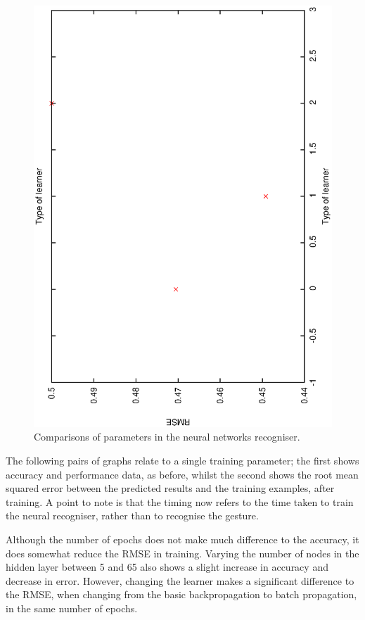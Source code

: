 \documentclass[12pt,a4,notitlepage]{report}
\renewcommand{\_}{\texttt{\symbol{95}}}
\newcommand{\<}{\texttt{\symbol{60}}}
\renewcommand{\>}{\texttt{\symbol{62}}}
\begin{document}
\begin{figure}
\includegraphics[scale=0.3,angle=-90]{results/neural_err/n_learner.ps}
\caption{Comparisons of parameters in the neural networks recogniser.}
\label{n_intparameters}
\end{figure}

The following pairs of graphs relate to a single training parameter; the first shows accuracy and performance data, as before, whilst the second shows the root mean squared error between the predicted results and the training examples, after training. A point to note is that the timing now refers to the time taken to train the neural recogniser, rather than to recognise the gesture.

Although the number of epochs does not make much difference to the accuracy, it does somewhat reduce the RMSE in training. Varying the number of nodes in the hidden layer between 5 and 65 also shows a slight increase in accuracy and decrease in error. However, changing the learner makes a significant difference to the RMSE, when changing from the basic backpropagation to batch propagation, in the same number of epochs.
\end{document}
